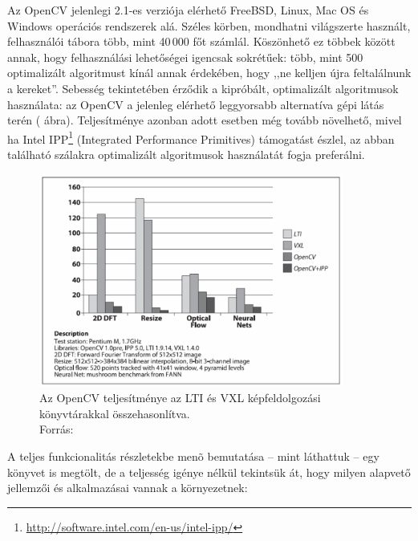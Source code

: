 Az OpenCV jelenlegi 2.1-es verziója elérhető FreeBSD, Linux, Mac OS és Windows operációs rendszerek alá. Széles körben, mondhatni világszerte használt, felhasználói tábora több, mint 40\,000 főt számlál. Köszönhető ez többek között annak, hogy felhasználási lehetőségei igencsak sokrétűek: több, mint 500 optimalizált algoritmust kínál annak érdekében, hogy ,,ne kelljen újra feltalálnunk a kereket''. Sebesség tekintetében érződik a kipróbált, optimalizált algoritmusok használata: az OpenCV a jelenleg elérhető leggyorsabb alternatíva gépi látás terén ( ábra). Teljesítménye azonban adott esetben még tovább növelhető, mivel ha Intel IPP\footnote{\url{http://software.intel.com/en-us/intel-ipp/}} (Integrated Performance Primitives) támogatást észlel, az abban található szálakra optimalizált algoritmusok használatát fogja preferálni.

\begin{figure}[!ht]
\centering
\includegraphics[width=100mm, keepaspectratio]{figures/opencv_speed.png}
\caption{Az OpenCV teljesítménye az LTI és VXL képfeldolgozási könyvtárakkal összehasonlítva.\\Forrás: \cite{opencv_book}}
\label{fig:opencv_speed}
\end{figure}

A teljes funkcionalitás részletekbe menõ bemutatása -- mint láthattuk \cite{opencv_book} -- egy könyvet is megtölt, de a teljesség igénye nélkül tekintsük át, hogy milyen alapvető jellemzői és alkalmazásai vannak a környezetnek:

